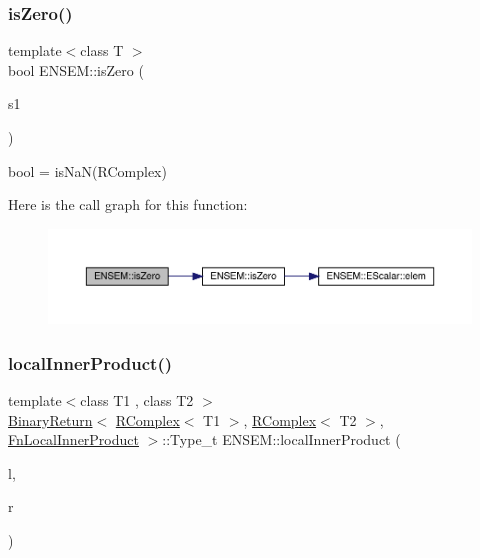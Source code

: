 \subsubsection{\texorpdfstring{isZero()}{isZero()}}
{\footnotesize\ttfamily template$<$class T $>$ \\
bool E\+N\+S\+E\+M\+::is\+Zero (\begin{DoxyParamCaption}\item[{const \mbox{\hyperlink{classENSEM_1_1RComplex}{R\+Complex}}$<$ T $>$ \&}]{s1 }\end{DoxyParamCaption})}



bool = is\+Na\+N(\+R\+Complex) 

Here is the call graph for this function\+:\nopagebreak
\begin{figure}[H]
\begin{center}
\leavevmode
\includegraphics[width=350pt]{da/dc7/group__rcomplex_ga21235851ad3c6bba4973c55332baaa9e_cgraph}
\end{center}
\end{figure}
\mbox{\label{group__rcomplex_ga4ccc8c0a3c54b7eb19e0d5aa1c6ac89d}} 
\subsubsection{\texorpdfstring{localInnerProduct()}{localInnerProduct()}}
{\footnotesize\ttfamily template$<$class T1 , class T2 $>$ \\
\mbox{\hyperlink{structENSEM_1_1BinaryReturn}{Binary\+Return}}$<$ \mbox{\hyperlink{classENSEM_1_1RComplex}{R\+Complex}}$<$ T1 $>$, \mbox{\hyperlink{classENSEM_1_1RComplex}{R\+Complex}}$<$ T2 $>$, \mbox{\hyperlink{structENSEM_1_1FnLocalInnerProduct}{Fn\+Local\+Inner\+Product}} $>$\+::Type\+\_\+t E\+N\+S\+E\+M\+::local\+Inner\+Product (\begin{DoxyParamCaption}\item[{const \mbox{\hyperlink{classENSEM_1_1RComplex}{R\+Complex}}$<$ T1 $>$ \&}]{l,  }\item[{const \mbox{\hyperlink{classENSEM_1_1RComplex}{R\+Complex}}$<$ T2 $>$ \&}]{r }\end{DoxyParamCaption})\hspace{0.3cm}{\ttfamily [inline]}}

